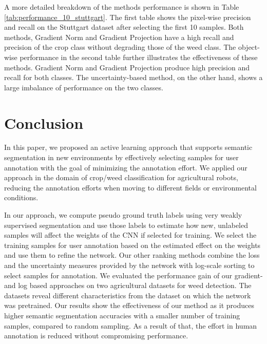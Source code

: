 \documentclass[letterpaper, 10 pt, conference]{ieeeconf}  %
\begin{document}
A more detailed breakdown of the methods performance is shown in Table \ref{tab:performance_10_stuttgart}. The first table shows the pixel-wise precision and recall on the Stuttgart dataset after selecting the first 10 samples. Both methods, Gradient Norm and Gradient Projection have a high recall and precision of the crop class without degrading those of the weed class. The object-wise performance in the second table further illustrates the effectiveness of these methods. Gradient Norm and Gradient Projection produce high precision and recall for both classes. The uncertainty-based method, on the other hand, shows a large imbalance of performance on the two classes.
   






\section{Conclusion}
\label{sec:conclusion}

In this paper, we proposed an active learning approach that supports semantic
segmentation in new environments by effectively selecting samples for user
annotation with the goal of minimizing the annotation effort. We applied our
approach in the domain of crop/weed classification for agricultural robots,
reducing the annotation efforts when moving to different fields or environmental
conditions.

In our approach, we compute pseudo ground truth labels using very weakly supervised 
segmentation and use those labels to estimate how new, unlabeled samples will 
affect the weights of the CNN if selected for training. We select the training
samples for user annotation based on the estimated effect on the weights and use them to refine the 
network. Our other ranking methods combine the loss and the uncertainty measures provided by the network with 
log-scale sorting to select samples for annotation.
We evaluated  the performance gain of our gradient-and log based 
approaches on two agricultural  datasets for weed detection. The datasets 
reveal different characteristics from the dataset on which the network was pretrained.
Our results show the effectiveness of our method as it produces higher semantic segmentation
accuracies with a smaller number of training samples, compared to random sampling. As a result
of that, the effort in human annotation is reduced without compromising
performance.
 



\end{document}
